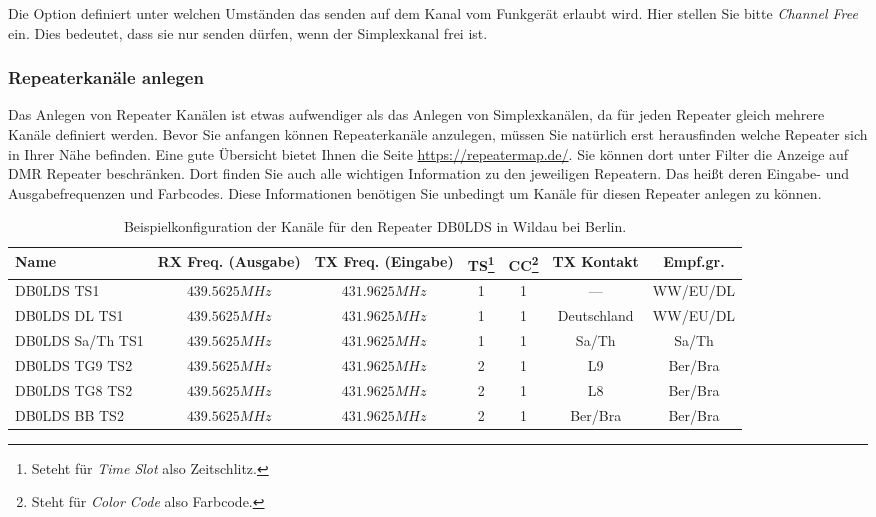 Die Option  definiert unter welchen Umständen das senden auf dem Kanal vom Funkgerät erlaubt wird. Hier stellen Sie bitte \emph{Channel Free} ein. Dies bedeutet, dass sie nur senden dürfen, wenn der Simplexkanal frei ist.  

\subsubsection{Repeaterkanäle anlegen}
Das Anlegen von Repeater Kanälen ist etwas aufwendiger als das Anlegen von Simplexkanälen, da für jeden Repeater gleich mehrere Kanäle definiert werden. Bevor Sie anfangen können Repeaterkanäle anzulegen, müssen Sie natürlich erst herausfinden welche Repeater sich in Ihrer Nähe befinden. Eine gute Übersicht bietet Ihnen die Seite \url{https://repeatermap.de/}. Sie können dort unter Filter die Anzeige auf DMR Repeater beschränken. Dort finden Sie auch alle wichtigen Information zu den jeweiligen Repeatern. Das heißt deren Eingabe- und Ausgabefrequenzen und Farbcodes. Diese Informationen benötigen Sie unbedingt um Kanäle für diesen Repeater anlegen zu können.

\begin{sidewaystable}[p]
 \centering
 \begin{tabular}{|l|c|c|c|c|c|c|} \hline
  Name             & RX Freq. (Ausgabe) & TX Freq. (Eingabe) & TS\footnote{Seteht für \emph{Time Slot} also Zeitschlitz.} & CC\footnote{Steht für \emph{Color Code} also Farbcode.} & TX Kontakt & Empf.gr. \\ \hline
  DB0LDS TS1       & $439.5625 MHz$ & $431.9625 MHz$ & 1 & 1 & ---         & WW/EU/DL \\
  DB0LDS DL TS1    & $439.5625 MHz$ & $431.9625 MHz$ & 1 & 1 & Deutschland & WW/EU/DL \\
  DB0LDS Sa/Th TS1 & $439.5625 MHz$ & $431.9625 MHz$ & 1 & 1 & Sa/Th       & Sa/Th \\
  DB0LDS TG9 TS2    & $439.5625 MHz$ & $431.9625 MHz$ & 2 & 1 & L9          & Ber/Bra \\
  DB0LDS TG8 TS2    & $439.5625 MHz$ & $431.9625 MHz$ & 2 & 1 & L8          & Ber/Bra \\
  DB0LDS BB TS2    & $439.5625 MHz$ & $431.9625 MHz$ & 2 & 1 & Ber/Bra     & Ber/Bra \\ \hline
 \end{tabular}
 \caption{Beispielkonfiguration der Kanäle für den Repeater DB0LDS in Wildau bei Berlin.} \label{tab:ch:repeater}
\end{sidewaystable}

